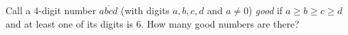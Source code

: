 Call a $4$-digit number $\overline{abcd}$ (with digits $a,b,c,d$ and $a\ne0$) \emph{good} if $a\ge b\ge c\ge d$ and at least one of its digits is $6$. How many good numbers are there?
